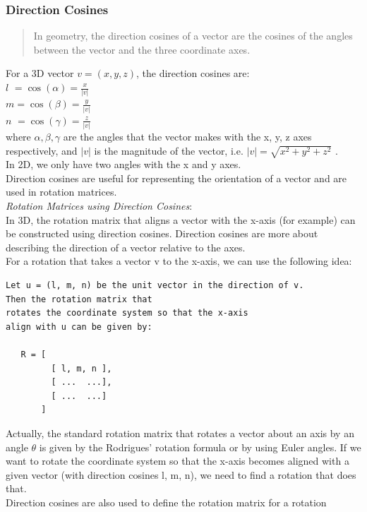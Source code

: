 \documentclass[a4paper,10pt]{article}
\begin{document}
\subsubsection{Direction Cosines}
\begin{quote}
In geometry, the direction cosines of a vector are the cosines of the angles between the
vector and the three coordinate axes.
\end{quote}
For a 3D vector \(v = (x, y, z)\), the direction cosines are:\\
   \(l\,\, = \cos(\alpha) = \frac{x}{|v|}\)\\
   \(m = \cos(\beta ) = \frac{y}{|v|}\)\\
   \(n\,\, = \cos(\gamma) = \frac{z}{|v|}\)\\
where \(\alpha, \beta, \gamma\) are the angles that the vector makes with the x, y, z axes respectively,
and \(|v|\) is the magnitude of the vector, i.e. \(|v| = \sqrt{x^2+y^2+z^2}  \) .\\
In 2D, we only have two angles with the x and y axes.\\
Direction cosines are useful for representing the orientation of a vector and are used in
rotation matrices.\\
\emph{Rotation Matrices using Direction Cosines}:\\
In 3D, the rotation matrix that aligns a vector with the x-axis (for example) can be
constructed using direction cosines. Direction cosines are more about describing the direction of a vector relative to the axes.\\
For a rotation that takes a vector v to the x-axis, we can use the following idea:\\
\begin{verbatim}
Let u = (l, m, n) be the unit vector in the direction of v.
Then the rotation matrix that
rotates the coordinate system so that the x-axis
align with u can be given by:

   R = [
         [ l, m, n ],
         [ ...  ...],
         [ ...  ...]
       ]

\end{verbatim}
Actually, the standard rotation matrix that rotates a vector about an axis by an angle \(\theta\) is
given by the Rodrigues' rotation formula or by using Euler angles. If we want to rotate the
coordinate system so that the x-axis becomes aligned with a given vector (with direction
cosines l, m, n), we need to find a rotation that does that.\\
Direction cosines are also used to define the rotation matrix for a rotation
\end{document}
